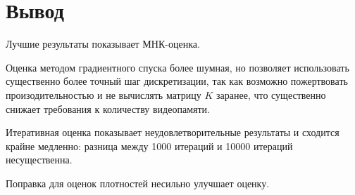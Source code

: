 \documentclass[../paper.tex]{subfiles}
\begin{document}
\section{Вывод}
Лучшие результаты показывает МНК-оценка.

Оценка методом градиентного спуска более шумная, но позволяет использовать
существенно более точный шаг дискретизации, так как возможно пожертвовать
произодительностью и не вычислять матрицу $K$ заранее, что существенно снижает
требования к количеству видеопамяти. 

Итеративная оценка показывает неудовлетворительные результаты и сходится крайне
медленно: разница между 1000 итераций и 10000 итераций несущественна.

Поправка для оценок плотностей несильно улучшает оценку.
\end{document}
